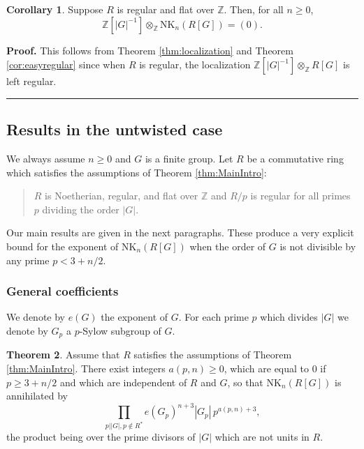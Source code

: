 \documentclass[reqno,11pt,letterpaper]{amsart}
\theoremstyle{plain}
\numberwithin{equation}{subsection}
\newtheorem{theorem}[equation]{Theorem}
\newtheorem{corollary}[equation]{Corollary}
\theoremstyle{remark}
\theoremstyle{plain}
\theoremstyle{definition}\newtheorem*{notation}{Notation}
\newtheorem{theorem}{Theorem}
\newtheorem{corollary}[theorem]{Corollary}
\newenvironment{proof}[1][Proof]{\noindent\textbf{#1.} }{\ \rule{0.5em}{0.5em}}
\newcommand{\RNK}{\mathrm{NK}}
\newcommand{\BZ}{\mathbb{Z}}
\begin{document}
 \begin{corollary}\label{cor:localization} 
 Suppose $R$ is regular and flat over $\BZ$. Then, for all $n\geq 0$,   
 \[
\BZ[ |G|^{-1}]\otimes_\BZ \RNK_n(R[G])=(0).
 \]
 \end{corollary}
 \begin{proof}
 This follows from Theorem \ref{thm:localization} and Theorem  \ref{cor:easyregular} since when $R$ is regular, the localization
$\BZ[ |G|^{-1}] \otimes_\BZ R[G]$ is left regular.
\end{proof}
 
 \subsection{Results in the untwisted case}\label{ss:results}
 
 We always assume $n\geq 0$ and $G$ is a finite group. Let  $R$ be a commutative ring which satisfies the assumptions of Theorem \ref{thm:MainIntro}:
\smallskip

\begin{quote} $R$ is Noetherian, regular, and flat over $\BZ$ and 
 $R/p$ is regular for all primes $p$
dividing the order $|G|$.
\end{quote}
\smallskip

 
 
 
 
 

Our main results are given in the next paragraphs.  
These produce a very explicit bound for the exponent of $\RNK_n(R[G])$ when the order of $G$ is not divisible by any prime $p<3+n/2$.
 


\subsubsection{General coefficients}

 We denote by $e(G)$ the exponent of $G$. 
 For each prime $p$ which divides $|G|$ we denote by $G_p$ a $p$-Sylow subgroup of $G$. 

\begin{theorem}\label{thm:general}  
Assume that $R$ satisfies the assumptions of Theorem \ref{thm:MainIntro}. 
There exist integers $a(p, n)\geq 0$, which are equal to $0$ if $p\geq 3+n/2$ and which are independent of 
$R$ and $G$, so that  $\RNK_{n}(R[G])$ is annihilated by 
\[
 \prod_{p||G|, p\not\in R^*} e(G_p)^{n+3}|G_p|\, p^{ a(p, n) +3},
\]
  the product being  over the prime divisors of $|
G|$ which are not units in $R$.
\end{theorem}
\end{document}
